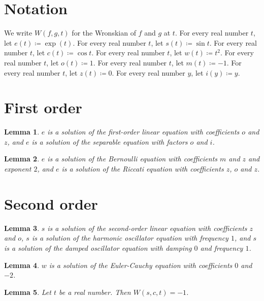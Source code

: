 \documentclass{article}
\newtheorem{lemma}{Lemma}
\begin{document}
\section{Notation}

We write $W(f,g,t)$ for the Wronskian of $f$ and $g$ at $t$.
For every real number $t$, let $e(t)\coloneqq\exp(t)$.
For every real number $t$, let $s(t)\coloneqq\sin t$.
For every real number $t$, let $c(t)\coloneqq\cos t$.
For every real number $t$, let $w(t)\coloneqq t^2$.
For every real number $t$, let $o(t)\coloneqq1$.
For every real number $t$, let $m(t)\coloneqq-1$.
For every real number $t$, let $z(t)\coloneqq0$.
For every real number $y$, let $i(y)\coloneqq y$.

\section{First order}

\begin{lemma}\label{first}
$e$ is a solution of the first-order linear equation with coefficients $o$ and $z$, and $e$ is a solution of the separable equation with factors $o$ and $i$.
\end{lemma}

\begin{lemma}\label{nonlinear}
$e$ is a solution of the Bernoulli equation with coefficients $m$ and $z$ and exponent $2$, and $e$ is a solution of the Riccati equation with coefficients $z$, $o$ and $z$.
\end{lemma}

\section{Second order}

\begin{lemma}\label{second}
$s$ is a solution of the second-order linear equation with coefficients $z$ and $o$, $s$ is a solution of the harmonic oscillator equation with frequency $1$, and $s$ is a solution of the damped oscillator equation with damping $0$ and frequency $1$.
\end{lemma}

\begin{lemma}\label{euler}
$w$ is a solution of the Euler-Cauchy equation with coefficients $0$ and $-2$.
\end{lemma}

\begin{lemma}\label{wronskian}
Let $t$ be a real number. Then $W(s,c,t)=-1$.
\end{lemma}
\end{document}
